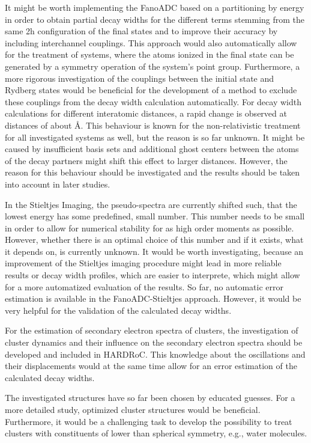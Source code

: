 It might be worth implementing the FanoADC based on a partitioning by energy in
order to obtain partial decay widths for the different terms stemming from the
same 2h configuration of the final states and to
improve their accuracy by including interchannel couplings. This approach
would also automatically allow for the treatment of systems, where the
atoms ionized in the final state can be generated by a symmetry operation
of the system's point group.
Furthermore, a more rigorous investigation of the couplings between the
initial state and Rydberg states would be beneficial for the development
of a method to exclude these couplings from the decay width calculation
automatically.
For decay width calculations for different interatomic distances,
a rapid change is observed at distances of about \unit[10 -- 15]{\AA}.
This behaviour is known for the non-relativistic treatment for all
investigated systems as well,
but the reason is so far unknown. It might be caused by insufficient
basis sets and additional ghost centers between the atoms of the decay partners
might shift this effect to larger distances. However, the reason for
this behaviour should be investigated and the results should be taken
into account in later studies.

In the Stieltjes Imaging, the pseudo-spectra are currently shifted such,
that the lowest energy has some predefined, small number. This number needs
to be small in order to allow for numerical stability for as high order
moments as possible. However, whether there is an optimal choice of this
number and if it exists, what it depends on, is currently unknown.
It would be worth investigating, because an improvement of the Stieltjes
imaging procedure might lead in more reliable results or decay width profiles,
which are easier to interprete, which might allow for a more automatized
evaluation of the results.
So far, no automatic error estimation is available in the FanoADC-Stieltjes
approach. However, it would be very helpful for the validation of the
calculated decay widths.

For the estimation of secondary electron spectra of clusters,
the investigation of cluster dynamics and their influence on the
secondary electron spectra should be developed and included in
HARDRoC. This knowledge about the oscillations and their displacements
would at the same time allow for an error estimation of
the calculated decay widths.

The investigated structures have so far been chosen by educated guesses.
For a more detailed study, optimized cluster structures would be beneficial.
Furthermore, it would be a challenging task to develop the possibility to
treat clusters with constituents of lower than spherical symmetry, e.g.,
water molecules.
